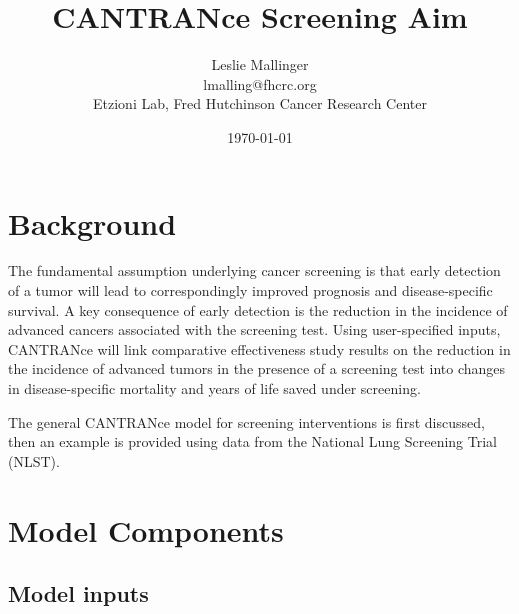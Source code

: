 \documentclass[11pt]{article}
\begin{document}



\title{CANTRANce Screening Aim}
\date{\today}
\author{Leslie Mallinger \\
		\small lmalling@fhcrc.org \\
		\small Etzioni Lab, Fred Hutchinson Cancer Research Center}
\maketitle


\section{Background}

The fundamental assumption underlying cancer screening is that early detection of a tumor will lead to correspondingly improved prognosis and disease-specific survival.
A key consequence of early detection is the reduction in the incidence of advanced cancers associated with the screening test.
Using user-specified inputs, CANTRANce will link comparative effectiveness study results on the reduction in the incidence of advanced tumors in the presence of a screening test into changes in disease-specific mortality and years of life saved under screening.

The general CANTRANce model for screening interventions is first discussed, then an example is provided using data from the National Lung Screening Trial (NLST). 


\section{Model Components}

\subsection{Model inputs}	
\end{document}
